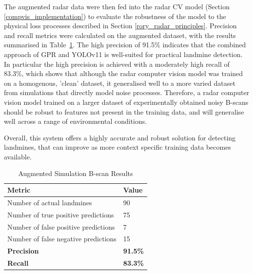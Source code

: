         The augmented radar data were then fed into the radar CV model (Section \ref{compvis_implementation}) to evaluate the robustness of the model to the physical loss processes described in Section \ref{rory_radar_principles}. Precision and recall metrics were calculated on the augmented dataset, with the results summarised in Table~\ref{tab:cv_results}. The high precision of 91.5\% indicates that the combined approach of GPR and YOLOv11 is well-suited for practical landmine detection. In particular the high precision is achieved with a moderately high recall of 83.3\%, which shows that although the radar computer vision model was trained on a homogenous, 'clean' dataset, it generalised well to a more varied dataset from simulations that directly model noise processes. Therefore, a radar computer vision model trained on a larger dataset of experimentally obtained noisy B-scans should be robust to features not present in the training data, and will generalise well across a range of environmental conditions.

        Overall, this system offers a highly accurate and robust solution for detecting landmines, that can improve as more context specific training data becomes available.

        \begin{table}[htbp]
          \centering
          \caption{Augmented Simulation B-scan Results}
          \label{tab:cv_results}
          \begin{tabular}{@{} l l @{}} 
            \toprule
            \textbf{Metric} & \textbf{Value} \\
            \midrule
            Number of actual landmines & 90 \\
            Number of true positive predictions & 75 \\
            Number of false positive predictions & 7 \\
            Number of false negative predictions &  15\\
            \midrule
            \textbf{Precision} &  \textbf{91.5\%}\\
            \textbf{Recall} & \textbf{83.3\%}\\
            \bottomrule
          \end{tabular}
        \end{table}       
        